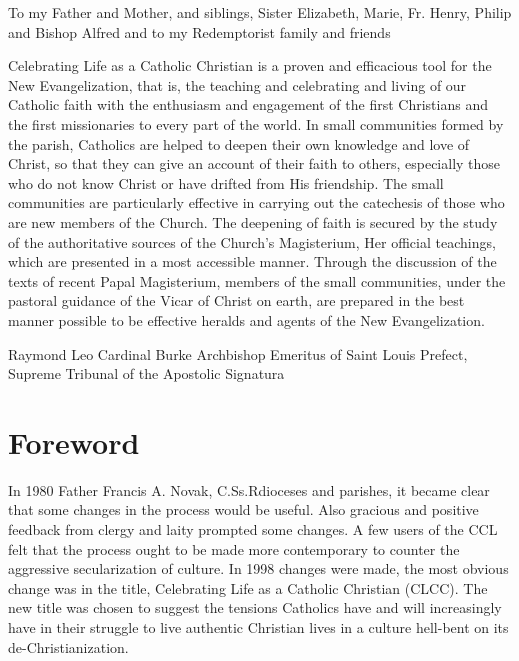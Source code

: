 \documentclass[oneside]{book}
\begin{document}

To my Father and Mother, and siblings, Sister Elizabeth, Marie, Fr. Henry,
Philip and Bishop Alfred and to my Redemptorist family and friends


\maketitle


Celebrating Life as a Catholic Christian is a proven and efficacious tool for
the New Evangelization, that is, the teaching and celebrating and living of our
Catholic faith with the enthusiasm and engagement of the first Christians and
the first missionaries to every part of the world.  In small communities formed
by the parish, Catholics are helped to deepen their own knowledge and love of
Christ, so that they can give an account of their faith to others, especially
those who do not know Christ or have drifted from His friendship.  The small
communities are particularly effective in carrying out the catechesis of those
who are new members of the Church.  The deepening of faith is secured by the
study of the authoritative sources of the Church's Magisterium, Her official
teachings, which are presented in a most accessible manner.  Through the
discussion of the texts of recent Papal Magisterium, members of the small
communities, under the pastoral guidance of the Vicar of Christ on earth, are
prepared in the best manner possible to be effective heralds and agents of the
New Evangelization.

Raymond Leo Cardinal Burke
Archbishop Emeritus of Saint Louis
Prefect, Supreme Tribunal of the Apostolic Signatura


\chapter{Foreword}

In 1980 Father Francis A. Novak, C.Ss.Rdioceses and parishes, it became clear
that some changes in the process would be useful. Also gracious and positive
feedback from clergy and laity prompted some changes. A few users of the CCL
felt that the process ought to be made more contemporary to counter the
aggressive secularization of culture. In 1998 changes were made, the most
obvious change was in the title, Celebrating Life as a Catholic Christian
(CLCC). The new title was chosen to suggest the tensions Catholics have and will
increasingly have in their struggle to live authentic Christian lives in a
culture hell-bent on its de-Christianization.
\end{document}

